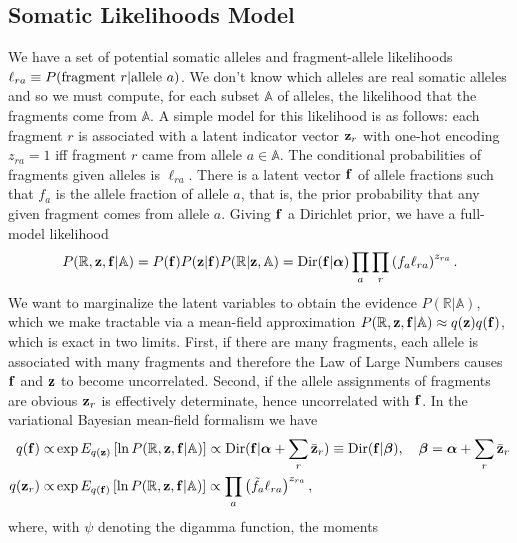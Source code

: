 \documentclass[nofootinbib,amssymb,amsmath]{revtex4}
\newcommand{\vf}{{\bf f}}
\newcommand{\vz}{{\bf z}}
\newcommand{\valpha}{{\bm{\alpha}}}
\newcommand{\vbeta}{{\bm{\beta}}}
\begin{document}
\subsection{Somatic Likelihoods Model}\label{introduction}
We have a set of potential somatic alleles and fragment-allele likelihoods $\ell_{ra} \equiv P({\rm fragment~}r|{\rm allele~}a)$.  We don't know which alleles are real somatic alleles and so we must compute, for each subset $\mathbb{A}$ of alleles, the likelihood that the fragments come from $\mathbb{A}$.  A simple model for this likelihood is as follows: each fragment $r$ is associated with a latent indicator vector $\vz_r$ with one-hot encoding $z_{ra} = 1$ iff fragment $r$ came from allele $a \in \mathbb{A}$.  The conditional probabilities of fragments given alleles is $\ell_{ra}$.
There is a latent vector $\vf$ of allele fractions such that $f_a$ is the allele fraction of allele $a$, that is, the prior probability that any given fragment comes from allele $a$.  Giving $\vf$ a Dirichlet prior, we have a full-model likelihood
\begin{equation}
P(\mathbb{R}, \vz, \vf | \mathbb{A}) = P(\vf) P(\vz | \vf)  P( \mathbb{R} | \vz, \mathbb{A}) = {\rm Dir}(\vf | \valpha) \prod_a  \prod_r \left( f_a \ell_{ra}\right)^{z_{ra}}.
\label{full_likelihood}
\end{equation}
We want to marginalize the latent variables to obtain the evidence $P(\mathbb{R} | \mathbb{A})$, which we make tractable via a mean-field approximation $P(\mathbb{R}, \vz, \vf | \mathbb{A}) \approx q(\vz) q(\vf)$, which is exact in two limits.  First, if there are many fragments, each allele is associated with many fragments and therefore the Law of Large Numbers causes $\vf$ and $\vz$ to become uncorrelated.  Second, if the allele assignments of fragments are obvious $\vz_r$ is effectively determinate, hence uncorrelated with $\vf$.  In the variational Bayesian mean-field formalism we have
\begin{align}
q(\vf) \propto& \exp E_{q(\vz)} \left[ \ln P(\mathbb{R}, \vz, \vf | \mathbb{A}) \right] \propto {\rm Dir}(\vf | \valpha + \sum_r \bar{\vz}_r) \equiv {\rm Dir}(\vf | \vbeta), \quad \vbeta = \valpha + \sum_r \bar{\vz}_r \label{z_mean_field}  \\
q(\vz_r) \propto& \exp E_{q(\vf)} \left[ \ln P(\mathbb{R}, \vz, \vf | \mathbb{A}) \right]  \propto \prod_a \left( \tilde{f}_a \ell_{ra}\right)^{z_{ra}}, \label{f_mean_field}
\end{align}
where, with $\psi$ denoting the digamma function, the moments
\end{document}
